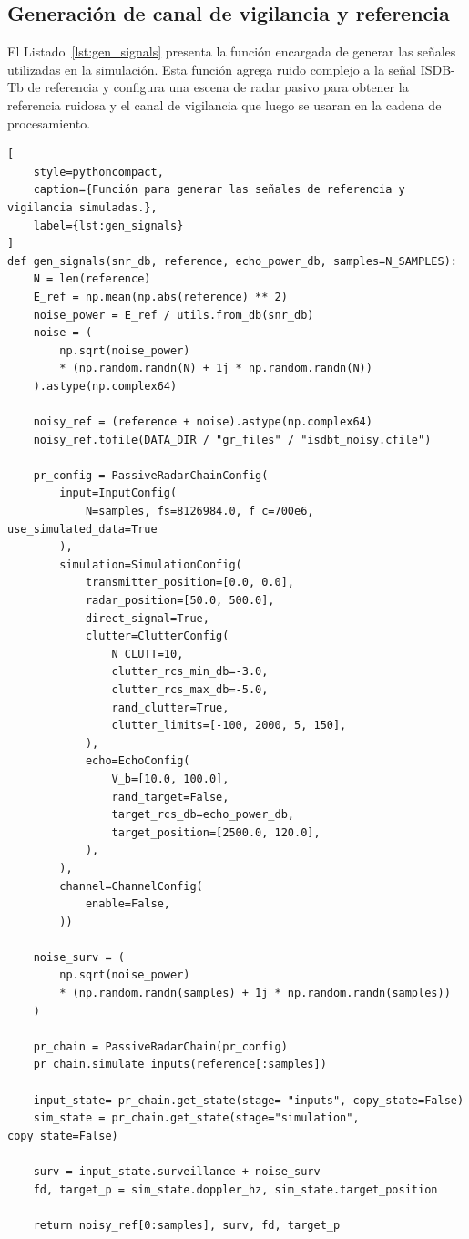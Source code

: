 \subsection{Generación de canal de vigilancia y referencia}
El Listado~\ref{lst:gen_signals} presenta la función encargada de generar las señales utilizadas en la simulación. Esta función agrega ruido complejo a la señal ISDB-Tb de referencia y configura una escena de radar pasivo para obtener la referencia ruidosa y el canal de vigilancia que luego se usaran en la cadena de procesamiento.\\\vspace{5pt}
\begin{lstlisting}[
    style=pythoncompact,
    caption={Función para generar las señales de referencia y vigilancia simuladas.},
    label={lst:gen_signals}
]
def gen_signals(snr_db, reference, echo_power_db, samples=N_SAMPLES):
    N = len(reference)
    E_ref = np.mean(np.abs(reference) ** 2)
    noise_power = E_ref / utils.from_db(snr_db)
    noise = (
        np.sqrt(noise_power)
        * (np.random.randn(N) + 1j * np.random.randn(N))
    ).astype(np.complex64)

    noisy_ref = (reference + noise).astype(np.complex64)
    noisy_ref.tofile(DATA_DIR / "gr_files" / "isdbt_noisy.cfile")

    pr_config = PassiveRadarChainConfig(
        input=InputConfig(
            N=samples, fs=8126984.0, f_c=700e6, use_simulated_data=True
        ),
        simulation=SimulationConfig(
            transmitter_position=[0.0, 0.0],
            radar_position=[50.0, 500.0],
            direct_signal=True,
            clutter=ClutterConfig(
                N_CLUTT=10,
                clutter_rcs_min_db=-3.0,
                clutter_rcs_max_db=-5.0,
                rand_clutter=True,
                clutter_limits=[-100, 2000, 5, 150],
            ),
            echo=EchoConfig(
                V_b=[10.0, 100.0],
                rand_target=False,
                target_rcs_db=echo_power_db,
                target_position=[2500.0, 120.0],
            ),
        ),
        channel=ChannelConfig(
            enable=False,
        ))
    
    noise_surv = (
        np.sqrt(noise_power)
        * (np.random.randn(samples) + 1j * np.random.randn(samples))
    )

    pr_chain = PassiveRadarChain(pr_config)
    pr_chain.simulate_inputs(reference[:samples])    
    
    input_state= pr_chain.get_state(stage= "inputs", copy_state=False)
    sim_state = pr_chain.get_state(stage="simulation", copy_state=False)

    surv = input_state.surveillance + noise_surv
    fd, target_p = sim_state.doppler_hz, sim_state.target_position

    return noisy_ref[0:samples], surv, fd, target_p
\end{lstlisting}
\newpage
